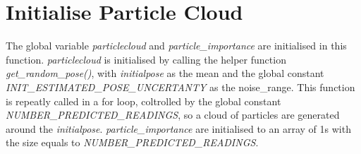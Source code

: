 \documentclass[11pt,a4paper]{article}
\begin{document}
  


  \section{Initialise Particle Cloud}
  The global variable \textit{particlecloud} and \textit{particle\_importance} are initialised in this function.  
  \textit{particlecloud} is initialised by calling the helper function \textit{get\_random\_pose()}, 
  with \textit{initialpose} as the mean and the global constant \textit{INIT\_ESTIMATED\_POSE\_UNCERTANTY} as the noise\_range. 
  This function is repeatly called in a for loop, coltrolled by the global constant \textit{NUMBER\_PREDICTED\_READINGS}, so a cloud of particles 
  are generated around the \textit{initialpose}. \textit{particle\_importance} are initialised to an array of 1s with the size equals to \textit{NUMBER\_PREDICTED\_READINGS}.

    
\end{document}
